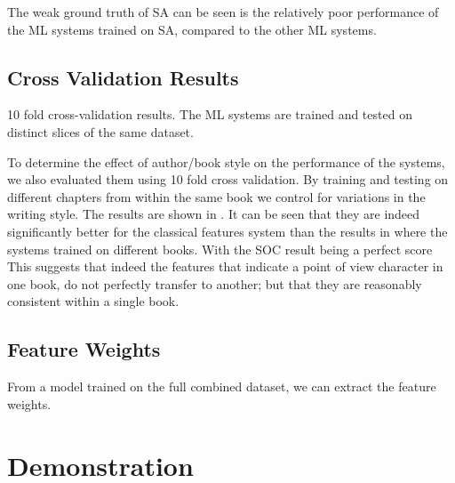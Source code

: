 \documentclass[11pt,a4paper]{article}
\begin{document}
The weak ground truth of SA can be seen is the relatively poor performance of the ML systems trained on SA, compared to the other ML systems.



\subsection{Cross Validation Results}

\begin{table}
	\begin{adjustbox}{max width=\textwidth}
	\end{adjustbox}
	
	\caption{10 fold cross-validation results. The ML systems are trained and tested on distinct slices of the same dataset. \label{tbl:rescross}}
\end{table}

To determine the effect of author/book style on the performance of the systems,
we also evaluated them using 10 fold cross validation.
By training and testing on different chapters from within the same book we control for variations in the writing style.
The results are shown in  .
It can be seen that they are indeed significantly better for the classical features system than the results in  where the systems trained on different books.
With the SOC result being a perfect score
This suggests that indeed the features that indicate a point of view character in one book, do not perfectly transfer to another; but that they are reasonably consistent within a single book.





\subsection{Feature Weights}\label{sec:featureweights}
From a model trained on the full combined dataset,
we can extract the feature weights.





\section{Demonstration}
\end{document}
